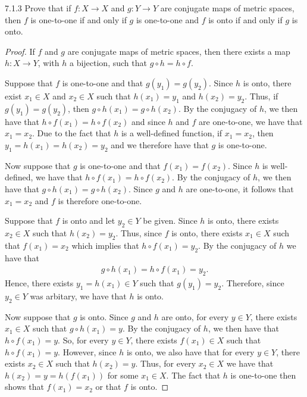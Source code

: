 \begin{problem}{7.1.3}
  Prove that if $f:X\to X $ and $g: Y\to Y$ are conjugate maps of metric spaces,
  then $f$ is one-to-one if and only if $g$ is one-to-one and $f$ is onto
  if and only if $g$ is onto.
\end{problem}

\begin{proof}
    If $f$ and $g$ are conjugate maps of metric spaces, then there exists a map
    $h : X \to Y$, with $h$ a bijection, such that $g \circ h = h \circ f $.

    Suppose that $f$ is one-to-one and that $g(y_1) = g(y_2)$. Since $h$ is onto,
    there exist $x_1\in X$ and $x_2 \in X$ such that $h(x_1) = y_1$ and $h(x_2) = y_2$.
    Thus, if $g(y_1) = g(y_2)$, then $g \circ h (x_1) = g \circ h (x_2)$. By
    the conjugacy of $h$, we then have that $h \circ f (x_1) = h \circ f (x_2)$
    and since $h$ and $f$ are one-to-one, we have that $x_1 = x_2$. Due to the fact
    that $h$ is a well-defined function, if $x_1 = x_2$, then
    $y_1 = h(x_1) = h(x_2) = y_2$ and we therefore have that $g$ is one-to-one.

    Now suppose that $g$ is one-to-one and that $f(x_1) = f(x_2)$. Since $h$ is well-defined,
    we have that $h \circ f(x_1) = h \circ f(x_2)$. By the conjugacy of $h$, we then have
    that $g \circ h(x_1) = g  \circ h(x_2)$. Since $g$ and $h$ are one-to-one, it follows
    that $x_1 = x_2$ and $f$ is therefore one-to-one.

    Suppose that $f$ is onto and let $y_2 \in Y$ be given. Since $h$ is onto,
    there exists $x_2 \in X$ such that $h(x_2) = y_2$. Thus, since $f$ is onto,
    there exists $x_1 \in X$ such that $f(x_1) = x_2$ which implies that
    $h \circ f (x_1) = y_2$. By the conjugacy of $h$ we have that
    \begin{align*}
      g \circ h (x_1) = h \circ f (x_1) = y_2.
    \end{align*}
    Hence, there exists $y_1 = h(x_1) \in Y$ such that $g(y_1) = y_2$. Therefore, since
    $y_2 \in Y$ was arbitary, we have that $h$ is onto.

    Now suppose that $g$ is onto. Since $g$ and $h$ are onto,
    for every $y\in Y$, there exists $x_1 \in X$ such that $g \circ h(x_1) = y$.
    By the conjugacy of $h$, we then have that $h \circ f(x_1) = y$. So, for every $y\in Y$,
    there exists $f(x_1) \in X$ such that $h \circ f (x_1) = y$. However,
    since $h$ is onto, we also have that for every $y\in Y$, there exists $x_2 \in X$
    such that $h(x_2) = y$. Thus, for every $x_2 \in X$ we have that $h(x_2) = y = h(f(x_1))$
    for some $x_1 \in X$. The fact that $h$ is one-to-one then shows that $f(x_1) = x_2$
    or that $f$ is onto.
\end{proof}
\newpage
